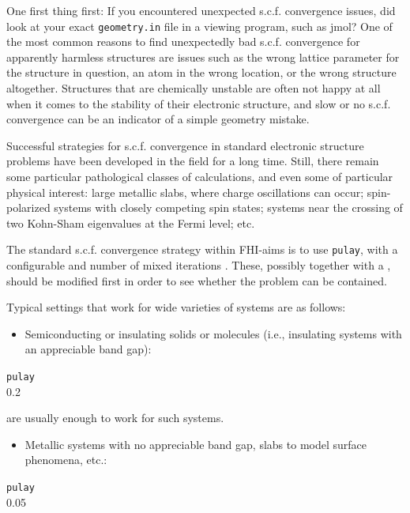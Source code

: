 One first thing first: If you encountered unexpected
s.c.f. convergence issues, did look at your exact \texttt{geometry.in}
file in a viewing program, such as jmol? One of the most common
reasons to find unexpectedly bad s.c.f. convergence for apparently
harmless structures are issues such as the wrong lattice parameter for
the structure in question, an atom in the wrong location, or the wrong
structure altogether. Structures that are chemically unstable are
often not happy at all when it comes to the stability of their
electronic structure, and slow or no s.c.f. convergence can be an
indicator of a simple geometry mistake.

Successful strategies for s.c.f. convergence in standard electronic
structure problems have been developed in the field for a long time.
Still, there remain some particular pathological classes of
calculations, and even some of particular physical interest: large
metallic slabs, where charge oscillations can occur; spin-polarized
systems with closely competing spin states; systems near the crossing
of two Kohn-Sham eigenvalues at the Fermi level; etc.  

The standard s.c.f. convergence strategy within FHI-aims is to use
 \texttt{pulay}, with a configurable
 and number of mixed iterations
. These, possibly together with a
, should be modified first in order to see
whether the problem can be contained. 

Typical settings that work for wide varieties of systems are as follows:

\begin{itemize}
  \item Semiconducting or insulating solids or molecules (i.e.,
    insulating systems with an appreciable band gap):
\end{itemize}

 \texttt{pulay} \\
 0.2 \\

are usually enough to work for such systems.

\begin{itemize}
  \item Metallic systems with no appreciable band gap, slabs to model
    surface phenomena, etc.:
\end{itemize}

 \texttt{pulay} \\
 0.05 \\

